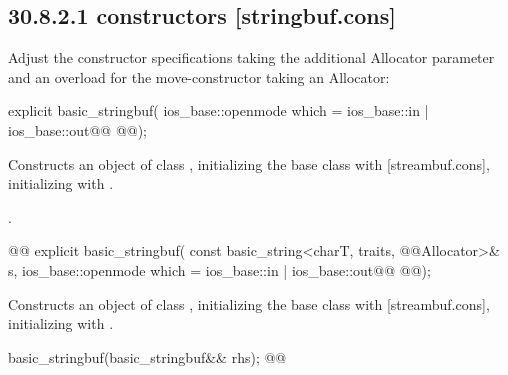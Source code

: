 \documentclass[ebook,11pt,article]{memoir}
\newcommand{\iref}[1]{[#1]}
\begin{document}
\subsection{30.8.2.1  constructors [stringbuf.cons]}
Adjust the constructor specifications taking the additional Allocator parameter and an overload for the move-constructor taking an Allocator:

\begin{itemdecl}
explicit basic_stringbuf(
  ios_base::openmode which = ios_base::in | ios_base::out@\added{,}@
  @@);
\end{itemdecl}

\begin{itemdescr}
\pnum
\effects
Constructs an object of class
,
initializing the base class with
\iref{streambuf.cons},  initializing
with .

\pnum
\postconditions
{}.
\end{itemdescr}

\begin{itemdecl}
@@
explicit basic_stringbuf(
  const basic_string<charT, traits, @@Allocator>& s,
  ios_base::openmode which = ios_base::in | ios_base::out@\added{,}@
  @@);
\end{itemdecl}

\begin{itemdescr}
\pnum
\effects
Constructs an object of class
,
initializing the base class with
\iref{streambuf.cons},  initializing
with .
\end{itemdescr}

\begin{itemdecl}
basic_stringbuf(basic_stringbuf&& rhs);
@@
\end{itemdecl}
\end{document}
